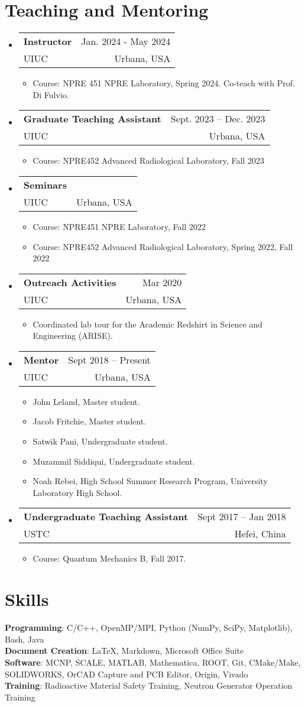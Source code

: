 \documentclass[letterpaper,11pt]{article} %
\makeatletter
\newcommand{\CVItem}[1]{
  \item\small{
    {#1 \vspace{-2pt}}
  }
}
\newcommand{\CVSubheading}[4]{
  \vspace{-2pt}\item
    \begin{tabular*}{0.97\textwidth}[t]{l@{\extracolsep{\fill}}r}
      \textbf{#1} & #2 \\
      \small#3 & \small #4 \\
    \end{tabular*}\vspace{-7pt}
}
\newcommand{\CVSubHeadingListStart}{\begin{itemize}[leftmargin=0.5cm, label={}]}
\newcommand{\CVSubHeadingListEnd}{\end{itemize}}
\newcommand{\CVItemListStart}{\begin{itemize}}
\newcommand{\CVItemListEnd}{\end{itemize}\vspace{-5pt}}
\makeatother
\begin{document}
\section{Teaching and Mentoring}
\CVSubHeadingListStart
    \CVSubheading
    {Instructor}{Jan. 2024 - May 2024}
    {UIUC}{Urbana, USA}
    \CVItemListStart
      \CVItem{Course: NPRE 451 NPRE Laboratory, Spring 2024. Co-teach with Prof. Di Fulvio.}
    \CVItemListEnd
    \CVSubheading
      {Graduate Teaching Assistant}{Sept. 2023 – Dec. 2023}
      {UIUC}{Urbana, USA}
      \CVItemListStart
        \CVItem{Course: NPRE452 Advanced Radiological Laboratory, Fall 2023}
      \CVItemListEnd
    \CVSubheading
      {Seminars}{}
      {UIUC}{Urbana, USA}
      \CVItemListStart
        \CVItem{Course: NPRE451 NPRE Laboratory, Fall 2022}
        \CVItem{Course: NPRE452 Advanced Radiological Laboratory, Spring 2022, Fall 2022}
      \CVItemListEnd
    \CVSubheading
      {Outreach Activities}{Mar 2020}
      {UIUC}{Urbana, USA}
      \CVItemListStart
        \CVItem{Coordinated lab tour for the Academic Redshirt in Science and Engineering (ARISE).}
      \CVItemListEnd
    \CVSubheading
      {Mentor}{Sept 2018 – Present}
      {UIUC}{Urbana, USA}
      \CVItemListStart
        \CVItem{John Leland, Master student.}
        \CVItem{Jacob Fritchie, Master student.}
        \CVItem{Satwik Pani, Undergraduate student.}
        \CVItem{Muzammil Siddiqui, Undergraduate student.}
        \CVItem{Noah Rebei, High School Summer Research Program, University Laboratory High School.}
      \CVItemListEnd
    \CVSubheading
      {Undergraduate Teaching Assistant}{Sept 2017 – Jan 2018}
      {USTC}{Hefei, China}
      \CVItemListStart
        \CVItem{Course: Quantum Mechanics B, Fall 2017.}
      \CVItemListEnd
  \CVSubHeadingListEnd

\begin{comment}
This section is compressed from the various skills sections that Euro CV
recommends.
\end{comment}

\section{Skills}
 \begin{itemize}[leftmargin=0.5cm, label={}]
    {\item{
     \textbf{Programming}{: C/C++, OpenMP/MPI, Python (NumPy, SciPy, Matplotlib), Bash, Java} \\
     \textbf{Document Creation}{: \LaTeX, Markdown, Microsoft Office Suite} \\
     \textbf{Software}{: MCNP, SCALE, MATLAB, Mathematica, ROOT, Git, CMake/Make, SOLIDWORKS, OrCAD Capture and PCB Editor, Origin, Vivado}\\
     \textbf{Training}{: Radioactive Material Safety Training, Neutron Generator Operation Training}
    }}
 \end{itemize}
\end{document}
